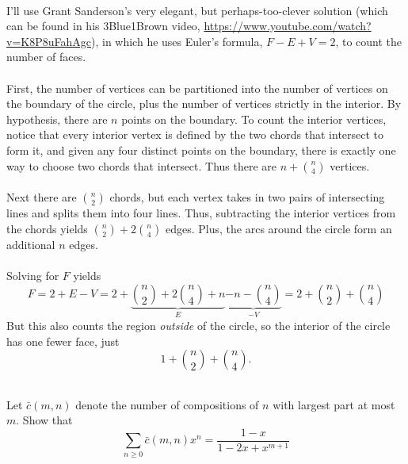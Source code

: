 \documentclass{article}
\newenvironment{problem}[2][Problem]{\begin{trivlist}
\item[\hskip \labelsep {\bfseries #1}\hskip \labelsep {\bfseries #2.}]}{\end{trivlist}}
\newenvironment{solution}[1][Solution.]{\begin{trivlist}
\item[\hskip \labelsep {\bfseries #1}]}{\end{trivlist}}
\begin{document}
\begin{solution} \text{} \\
  I'll use Grant Sanderson's very elegant, but perhaps-too-clever solution
  (which can be found in his 3Blue1Brown video, \url{https://www.youtube.com/watch?v=K8P8uFahAgc}), in which he uses Euler's
  formula, $F - E + V = 2$, to count the number of faces.
  \\~\\
  First, the number of vertices can be partitioned into the number of vertices
  on the boundary of the circle, plus the number of vertices strictly in the
  interior. By hypothesis, there are $n$ points on the boundary. To count the
  interior vertices, notice that every interior vertex is defined by the two
  chords that intersect to form it, and given any four distinct points on the
  boundary, there is exactly one way to choose two chords that intersect.
  Thus there are $n + \binom n 4$ vertices.
  \\~\\
  Next there are $\binom n 2$ chords, but each vertex takes in two pairs of
  intersecting lines and splits them into four lines. Thus, subtracting the
  interior vertices from the chords yields $\binom n 2 + 2\binom n 4$ edges.
  Plus, the arcs around the circle form an additional $n$ edges.
  \\~\\
  Solving for $F$ yields \[
    F = 2 + E - V
    = 2 + \underbrace{\binom n 2 + 2\binom n 4 + n}_E \underbrace{- n - \binom n 4}_{-V}
    = 2 + \binom n 2 + \binom n 4
  \]
  But this also counts the region \textit{outside} of the circle, so the
  interior of the circle has one fewer face, just \[
    1 + \binom n 2 + \binom n 4.
  \]
\end{solution}
\pagebreak
\begin{problem}{26} \text{} \\
  Let $\bar{c}(m,n)$ denote the number of compositions of $n$ with largest part
  at most $m$. Show that \[
    \sum_{n \geq 0}\bar c(m,n)x^n = \frac{1-x}{1-2x+x^{m+1}}
  \]
\end{problem}
\end{document}
